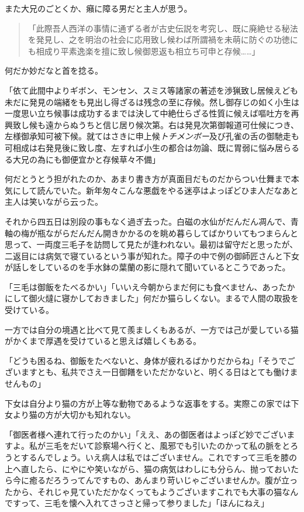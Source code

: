 \documentclass[12pt, openright]{book}
\begin{document}
また大兄のごとくか、癪に障る男だと主人が思う。

\blockquote{「此際吾人西洋の事情に通ずる者が古史伝説を考究し、既に廃絶せる秘法を発見し、之を明治の社会に応用致し候わば所謂禍を未萌に防ぐの功徳にも相成り平素逸楽を擅に致し候御恩返も相立ち可申と存候\ldots{}\ldots{}」}

何だか妙だなと首を捻る。

「依て此間中よりギボン、モンセン、スミス等諸家の著述を渉猟致し居候えども未だに発見の端緒をも見出し得ざるは残念の至に存候。然し御存じの如く小生は一度思い立ち候事は成功するまでは決して中絶仕らざる性質に候えば嘔吐方を再興致し候も遠からぬうちと信じ居り候次第。右は発見次第御報道可仕候につき、左様御承知可被下候。就てはさきに申上候\emph{トチメンボー}及び孔雀の舌の御馳走も可相成は右発見後に致し度、左すれば小生の都合は勿論、既に胃弱に悩み居らるる大兄の為にも御便宜かと存候草々不備」

何だとうとう担がれたのか、あまり書き方が真面目だものだからつい仕舞まで本気にして読んでいた。新年匆々こんな悪戯をやる迷亭はよっぽどひま人だなあと主人は笑いながら云った。

それから四五日は別段の事もなく過ぎ去った。白磁の水仙がだんだん凋んで、青軸の梅が瓶ながらだんだん開きかかるのを眺め暮らしてばかりいてもつまらんと思って、一両度三毛子を訪問して見たが逢われない。最初は留守だと思ったが、二返目には病気で寝ているという事が知れた。障子の中で例の御師匠さんと下女が話しをしているのを手水鉢の葉蘭の影に隠れて聞いているとこうであった。

「三毛は御飯をたべるかい」「いいえ今朝からまだ何にも食べません、あったかにして御火燵に寝かしておきました」何だか猫らしくない。まるで人間の取扱を受けている。

一方では自分の境遇と比べて見て羨ましくもあるが、一方では己が愛している猫がかくまで厚遇を受けていると思えば嬉しくもある。

「どうも困るね、御飯をたべないと、身体が疲れるばかりだからね」「そうでございますとも、私共でさえ一日御饍をいただかないと、明くる日はとても働けませんもの」

下女は自分より猫の方が上等な動物であるような返事をする。実際この家では下女より猫の方が大切かも知れない。

「御医者様へ連れて行ったのかい」「ええ、あの御医者はよっぽど妙でございますよ。私が三毛をだいて診察場へ行くと、風邪でも引いたのかって私の脈をとろうとするんでしょう。いえ病人は私ではございません。これですって三毛を膝の上へ直したら、にやにや笑いながら、猫の病気はわしにも分らん、抛っておいたら今に癒るだろうってんですもの、あんまり苛いじゃございませんか。腹が立ったから、それじゃ見ていただかなくってもようございますこれでも大事の猫なんですって、三毛を懐へ入れてさっさと帰って参りました」「ほんにねえ」
\end{document}
